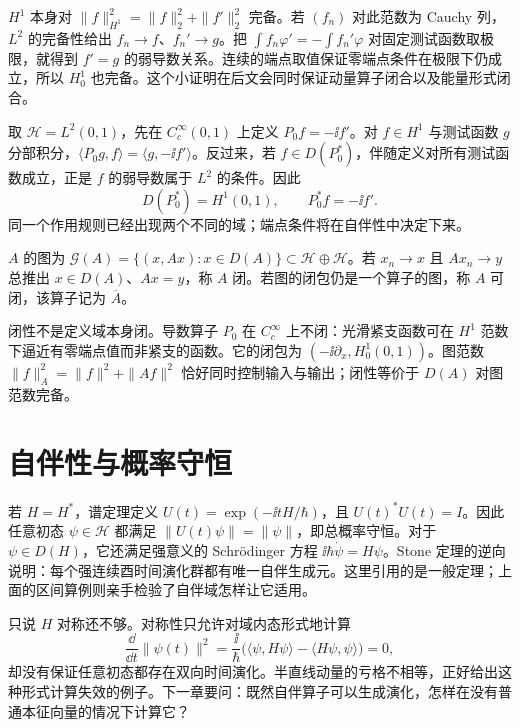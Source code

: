 \(H^1\) 本身对 \(\|f\|_{H^1}^2=\|f\|_2^2+\|f'\|_2^2\) 完备。若 \((f_n)\) 对此范数为 Cauchy 列，\(L^2\) 的完备性给出 \(f_n\to f\)、\(f_n'\to g\)。把 \(\int f_n\varphi'=-\int f_n'\varphi\) 对固定测试函数取极限，就得到 \(f'=g\) 的弱导数关系。连续的端点取值保证零端点条件在极限下仍成立，所以 \(H_0^1\) 也完备。这个小证明在后文会同时保证动量算子闭合以及能量形式闭合。

取 \(\mathcal H=L^2(0,1)\)，先在 \(C_c^\infty(0,1)\) 上定义 \(P_0f=-\ii f'\)。对 \(f\in H^1\) 与测试函数 \(g\) 分部积分，\(\langle P_0g,f\rangle=\langle g,-\ii f'\rangle\)。反过来，若 \(f\in D(P_0^*)\)，伴随定义对所有测试函数成立，正是 \(f\) 的弱导数属于 \(L^2\) 的条件。因此
\[
D(P_0^*)=H^1(0,1),\qquad P_0^*f=-\ii f'.
\]
同一个作用规则已经出现两个不同的域；端点条件将在自伴性中决定下来。

\begin{definition}[闭算子]
\(A\) 的图为 \(\mathcal G(A)=\{(x,Ax):x\in D(A)\}\subset\mathcal H\oplus\mathcal H\)。若 \(x_n\to x\) 且 \(Ax_n\to y\) 总推出 \(x\in D(A)\)、\(Ax=y\)，称 \(A\) 闭。若图的闭包仍是一个算子的图，称 \(A\) 可闭，该算子记为 \(\overline A\)。
\end{definition}

闭性不是定义域本身闭。导数算子 \(P_0\) 在 \(C_c^\infty\) 上不闭：光滑紧支函数可在 \(H^1\) 范数下逼近有零端点值而非紧支的函数。它的闭包为 \((-\ii\partial_x,H_0^1(0,1))\)。图范数 \(\|f\|_A^2=\|f\|^2+\|Af\|^2\) 恰好同时控制输入与输出；闭性等价于 \(D(A)\) 对图范数完备。




\section{自伴性与概率守恒}

若 \(H=H^*\)，谱定理定义 \(U(t)=\exp(-\ii tH/\hbar)\)，且 \(U(t)^*U(t)=I\)。因此任意初态 \(\psi\in\mathcal H\) 都满足 \(\|U(t)\psi\|=\|\psi\|\)，即总概率守恒。对于 \(\psi\in D(H)\)，它还满足强意义的 Schrödinger 方程 \(\ii\hbar\dot\psi=H\psi\)。Stone 定理的逆向说明：每个强连续酉时间演化群都有唯一自伴生成元。这里引用的是一般定理；上面的区间算例则亲手检验了自伴域怎样让它适用。

只说 \(H\) 对称还不够。对称性只允许对域内态形式地计算
\[
\frac{\dd}{\dd t}\|\psi(t)\|^2
=\frac{\ii}{\hbar}\bigl(\langle \psi,H\psi\rangle-\langle H\psi,\psi\rangle\bigr)=0,
\]
却没有保证任意初态都存在双向时间演化。半直线动量的亏格不相等，正好给出这种形式计算失效的例子。下一章要问：既然自伴算子可以生成演化，怎样在没有普通本征向量的情况下计算它？
